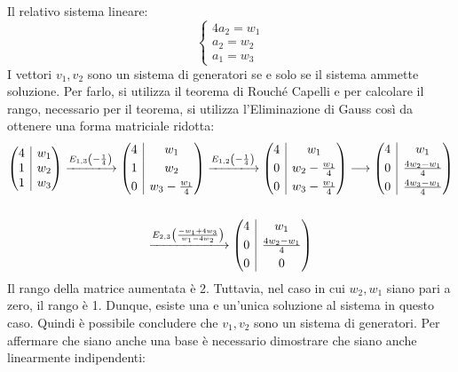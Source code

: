 \documentclass[a4paper]{article}
\makeatletter
\newenvironment{rowequmat}[1]{\left(\array{@{}#1@{}}}{\endarray\right)}
\makeatother
\begin{document}
	Il relativo sistema lineare:
	\begin{equation*}
		\begin{cases}
			4a_{2} = w_{1} \\
			a_{2} = w_{2} \\
			a_{1} = w_{3}
		\end{cases}
	\end{equation*}
	I vettori $v_{1},v_{2}$ sono un sistema di generatori se e solo se il sistema ammette soluzione. Per farlo, si utilizza il teorema di Rouché Capelli e per calcolare il rango, necessario per il teorema, si utilizza l'Eliminazione di Gauss così da ottenere una forma matriciale ridotta:
	\begin{gather*}
		\begin{rowequmat}{c|c}
			4 & w_{1} \\
			1 & w_{2} \\
			1 & w_{3}
		\end{rowequmat}
		\xlongrightarrow{E_{1,3}\left(-\frac{1}{4}\right)}
		\begin{rowequmat}{c|c}
			4 & w_{1} \\ [0.3em]
			1 & w_{2} \\ [0.3em]
			0 & w_{3} - \frac{w_{1}}{4}
		\end{rowequmat}
		\xlongrightarrow{E_{1,2}\left(-\frac{1}{4}\right)}
		\begin{rowequmat}{c|c}
			4 & w_{1} \\ [0.3em]
			0 & w_{2} - \frac{w_{1}}{4} \\ [0.3em]
			0 & w_{3} - \frac{w_{1}}{4}
		\end{rowequmat}
		\longrightarrow
		\begin{rowequmat}{c|c}
			4 & w_{1} \\ [0.3em]
			0 & \frac{4w_{2} - w_{1}}{4} \\ [0.3em]
			0 & \frac{4w_{3} - w_{1}}{4}
		\end{rowequmat} \\
		\\
		\xlongrightarrow{E_{2,3} \left( \frac{-w_{1} + 4w_{3}}{w_{1} - 4w_{2}} \right) }
		\begin{rowequmat}{c|c}
			4 & w_{1} \\ [0.3em]
			0 & \frac{4w_{2} - w_{1}}{4} \\ [0.3em]
			0 & 0
		\end{rowequmat}
	\end{gather*}
	Il rango della matrice aumentata è 2. Tuttavia, nel caso in cui $w_{2}, w_{1}$ siano pari a zero, il rango è 1. Dunque, esiste una e un'unica soluzione al sistema in questo caso. Quindi è possibile concludere che $v_{1},v_{2}$ sono un sistema di generatori. Per affermare che siano anche una base è necessario dimostrare che siano anche linearmente indipendenti:
\end{document}
